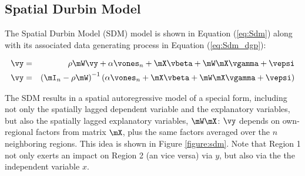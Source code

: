 \documentclass[english,12pt]{book}\usepackage[]{graphicx}\usepackage[]{xcolor}
\begin{document}
\subsection{Spatial Durbin Model}

The Spatial Durbin Model (SDM) model is shown in Equation (\ref{eq:Sdm}) along with its associated data generating process in Equation (\ref{eq:Sdm_dgp}):

\begin{eqnarray}
\vy & = & \rho \mW\vy + \alpha \vones_n + \mX\vbeta + \mW\mX\vgamma + \vepsi \label{eq:Sdm} \\
\vy & = & \left(\mI_n - \rho \mW\right)^{-1}\left(\alpha \vones_n + \mX\vbeta + \mW\mX\vgamma + \vepsi\right) \label{eq:Sdm_dgp}
\end{eqnarray}


The SDM results in a spatial autoregressive model of a special form, including not only the spatially lagged dependent variable and the explanatory variables, but also the spatially lagged explanatory variables, $\mW\mX$: $\vy$ depends on own-regional factors from matrix $\mX$, plus the same factors averaged over the $n$ neighboring regions. This idea is shown in Figure \ref{figure:sdm}. Note that Region 1 not only exerts an impact on Region 2 (an vice versa) via $y$, but also via the the independent variable $x$.
\end{document}
